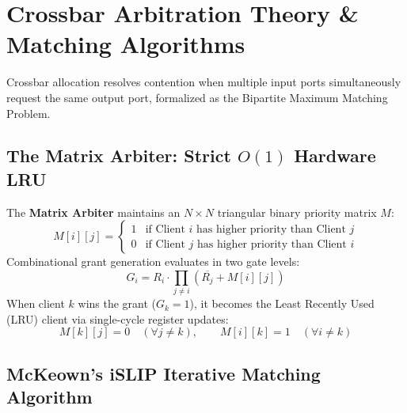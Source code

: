\section{Crossbar Arbitration Theory \& Matching Algorithms}
\label{sec:ch3_arbitration}

Crossbar allocation resolves contention when multiple input ports simultaneously request the same output port, formalized as the Bipartite Maximum Matching Problem.

\subsection{The Matrix Arbiter: Strict \texorpdfstring{$O(1)$}{O(1)} Hardware LRU}
\label{subsec:ch3_matrix_arbiter}

The \textbf{Matrix Arbiter} maintains an $N \times N$ triangular binary priority matrix $M$:
\begin{equation}
M[i][j] = \begin{cases} 
1 & \text{if Client } i \text{ has higher priority than Client } j \\ 
0 & \text{if Client } j \text{ has higher priority than Client } i 
\end{cases}
\end{equation}
Combinational grant generation evaluates in two gate levels:
\begin{equation}
G_i = R_i \cdot \prod_{j \ne i} (\overline{R_j} + M[i][j])
\label{eq:matrix_grant}
\end{equation}
When client $k$ wins the grant ($G_k = 1$), it becomes the Least Recently Used (LRU) client via single-cycle register updates:
\begin{equation}
M[k][j] = 0 \quad (\forall j \ne k), \qquad M[i][k] = 1 \quad (\forall i \ne k)
\label{eq:matrix_update}
\end{equation}

\subsection{McKeown's iSLIP Iterative Matching Algorithm}
\label{subsec:ch3_islip}

